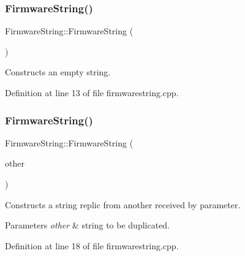 \subsubsection{\texorpdfstring{Firmware\+String()}{FirmwareString()}\hspace{0.1cm}{\footnotesize\ttfamily [1/3]}}
{\footnotesize\ttfamily Firmware\+String\+::\+Firmware\+String (\begin{DoxyParamCaption}{ }\end{DoxyParamCaption})}



Constructs an empty string. 



Definition at line 13 of file firmwarestring.\+cpp.

\mbox{\label{classFirmwareString_a3439d83bad2ac371123d26560f4f3716}} 
\subsubsection{\texorpdfstring{Firmware\+String()}{FirmwareString()}\hspace{0.1cm}{\footnotesize\ttfamily [2/3]}}
{\footnotesize\ttfamily Firmware\+String\+::\+Firmware\+String (\begin{DoxyParamCaption}\item[{\mbox{\hyperlink{classFirmwareString}{Firmware\+String}} \&}]{other }\end{DoxyParamCaption})}



Constructs a string replic from another received by parameter. 


\begin{DoxyParams}{Parameters}
{\em other} & string to be duplicated. \\
\hline
\end{DoxyParams}


Definition at line 18 of file firmwarestring.\+cpp.

\mbox{\label{classFirmwareString_a29f14882ef2a8274cebb7d153f0ea85b}} 
